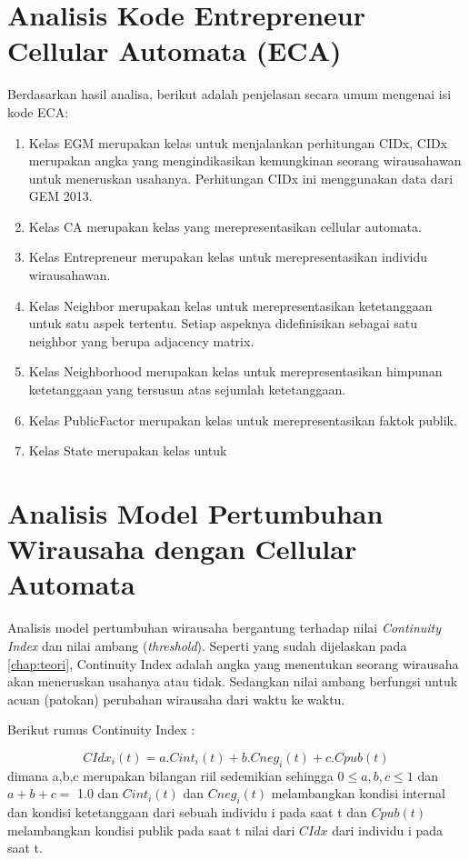 \section{Analisis Kode Entrepreneur Cellular Automata (ECA)}
\label{sec:analisisKode}

Berdasarkan hasil analisa, berikut adalah penjelasan secara umum mengenai isi kode ECA:
\begin{enumerate}
	\item Kelas EGM merupakan kelas untuk menjalankan perhitungan CIDx, CIDx merupakan angka yang mengindikasikan kemungkinan seorang wirausahawan untuk meneruskan usahanya. Perhitungan CIDx ini menggunakan data dari GEM 2013.
	\item Kelas CA merupakan kelas yang merepresentasikan cellular automata.
	\item Kelas Entrepreneur merupakan kelas untuk merepresentasikan individu wirausahawan.
	\item Kelas Neighbor merupakan kelas untuk merepresentasikan ketetanggaan untuk satu aspek tertentu. Setiap aspeknya didefinisikan sebagai satu neighbor yang berupa adjacency matrix.
	\item Kelas Neighborhood merupakan kelas untuk merepresentasikan himpunan ketetanggaan yang tersusun atas sejumlah ketetanggaan.
	\item Kelas PublicFactor merupakan kelas untuk merepresentasikan faktok publik.
	\item Kelas State merupakan kelas untuk 
\end{enumerate}

\section{Analisis Model Pertumbuhan Wirausaha dengan Cellular Automata}
\label{analisismodelCA}

Analisis model pertumbuhan wirausaha bergantung terhadap nilai \textit{Continuity Index} dan nilai ambang (\textit{threshold}). Seperti yang sudah dijelaskan pada \ref{chap:teori}, Continuity Index adalah angka yang menentukan seorang wirausaha akan meneruskan usahanya atau tidak. Sedangkan nilai ambang berfungsi untuk acuan (patokan) perubahan wirausaha dari waktu ke waktu.

Berikut rumus Continuity Index :

\begin{displaymath}
	CIdx_{i}(t) = a.Cint_{i}(t) + b.Cneg_{i}(t) + c.Cpub(t)
\end{displaymath}
dimana a,b,c merupakan bilangan riil sedemikian sehingga $0\leq a,b,c \leq 1$ dan $a+b+c=$ 1.0 dan $Cint_{i}(t)$ dan $Cneg_{i}(t)$ melambangkan kondisi internal dan kondisi ketetanggaan dari sebuah individu i pada saat t dan $Cpub(t)$ melambangkan kondisi publik pada saat t nilai dari $CIdx$ dari individu i pada saat t.



